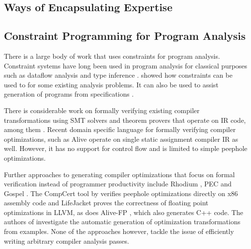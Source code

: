 \subsection{Ways of Encapsulating Expertise}


\subsection{Constraint Programming for Program Analysis}

    There is a large body of work that uses constraints for program analysis.
    Constraint systems have long been used in program analysis for classical
    purposes such as dataflow analysis and type inference
    \citep{Aiken:1999:ISC:339853.339897}.
    \citet{Gulwani:2008:PAC:1375581.1375616} showed how constraints can be
    used to for some  existing analysis problems.
    It can also be used to assist generation of programs from specifications
    \citep{Srivastava:2010:PVP:1707801.1706337}.

    There is considerable work on formally verifying existing compiler
    transformations using SMT solvers and theorem provers that operate on IR
    code, among them \cite{Zhao:2012:FLI:2103656.2103709}.
    Recent domain specific language for formally verifying compiler
    optimizations, such as Alive \cite{Lopes:2015:PCP:2737924.2737965} operate
    on single static assignment compiler IR as well.
    However, it has no support for control flow and is limited to simple
    peephole optimizations.

    Further approaches to generating compiler optimizations that focus on formal
    verification instead of programmer productivity include Rhodium
    \citep{Lerner:2005:ASP:1040305.1040335}, PEC
    \citep{Kundu:2009:POC:1543135.1542513} and Gospel
    \citep{Whitfield:1997:AEC:267959.267960}.
    The CompCert tool by \citet{Mullen:2016:VPO:2908080.2908109} verifies peephole
    optimizations directly on x86 assembly code and LifeJacket
    \cite{Notzli:2016:LVP:2931021.2931024} proves the correctness of floating
    point optimizations in LLVM, as does Alive-FP \cite{Menendez2016}, which
    also generates C++ code.
    The authors of \cite{Tate:2010:GCO:1706299.1706345} investigate the
    automatic generation of optimization transformations from examples.
    None of the approaches however, tackle the issue of efficiently writing
    arbitrary compiler analysis passes.

